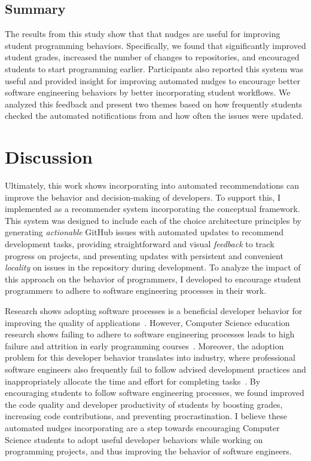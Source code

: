\subsection{Summary}

The results from this study show that that nudges are useful for improving student programming behaviors. Specifically, we found that \tooltwo significantly improved student grades, increased the number of changes to repositories, and encouraged students to start programming earlier. Participants also reported this system was useful and provided insight
for improving automated nudges to encourage better software
engineering behaviors by better incorporating student workflows. We analyzed this feedback and present two themes based on how frequently students checked the automated notifications from \tooltwo and how often the issues were updated.

\section{Discussion}

Ultimately, this work shows incorporating \framework into automated recommendations can improve the behavior and decision-making of developers. To support this, I implemented \tooltwo as a recommender system incorporating the conceptual framework. This system was designed to include each of the choice architecture principles by generating \textit{actionable} GitHub issues with automated updates to recommend development tasks, providing straightforward and visual \textit{feedback} to track progress on projects, and presenting updates with persistent and convenient \textit{locality} on issues in the repository during development. To analyze the impact of this approach on the behavior of programmers, I developed \tooltwo to encourage student programmers to adhere to software engineering processes in their work. 

Research shows adopting software processes is a beneficial developer behavior for improving the quality of applications~\cite{Clark97theeffects}. However, Computer Science education research shows failing to adhere to software engineering processes leads to high failure and attrition in early programming courses~\cite{beaubouef2005high}. Moreover, the adoption problem for this developer behavior translates into industry, where professional software engineers also frequently fail to follow advised development practices and inappropriately allocate the time and effort for completing tasks~\cite{Boehm1984SEEcon}. By encouraging students to follow software engineering processes, we found \tooltwo improved the code quality and developer productivity of students by boosting grades, increasing code contributions, and preventing procrastination. I believe these automated nudges incorporating \framework are a step towards encouraging Computer Science students to adopt useful developer behaviors while working on programming projects, and thus improving the behavior of software engineers.


